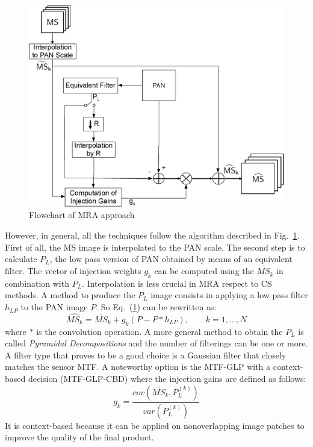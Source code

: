 \documentclass[12pt]{report}
\begin{document}
\begin{figure}[t!]
\centering
\includegraphics[width=\textwidth]{mra.png}
\caption{Flowchart of MRA approach \cite{criticalComparison}}
\label{fig:mraapproach}
\end{figure}

However, in general, all the techniques follow the algorithm described in Fig.~\ref{fig:mraapproach}. 
First of all, the MS image is interpolated to the PAN scale.
The second step is to calculate $P_L$, the low pass version of PAN obtained by means of an equivalent filter.
The vector of injection weights $g_k$ can be computed using the $\widetilde{MS_k}$ in combination with $P_L$.
Interpolation is less crucial in MRA respect to CS methods.
A method to produce the $P_L$ image consists in applying a low pass filter $h_{LP}$ to the PAN image $P$.
So Eq.~(\ref{fig:mraapproach}) can be rewritten as:
%
\begin{equation}
    \widehat{MS_k} = \widetilde{MS_k} + g_k(P-P*h_{LP}), \qquad k=1,\dots,N
    \label{mra1}
\end{equation}
%
where $*$ is the convolution operation.
A more general method to obtain the $P_L$ is called \textit{Pyramidal Decompositions} and the number of 
filterings can be one or more. A filter type that proves to be a good choice is a Gaussian filter that closely 
matches the sensor MTF. A noteworthy option is the MTF-GLP with a context-based decision (MTF-GLP-CBD) \cite{mtfglp}
where the injection gains are defined as follows: 
%
\begin{equation}
    g_k = \frac{cov(\widetilde{MS_k}, P_L^{(k)})}{var(P_L^{(k)})}
    \label{mragk}
\end{equation}
 It is context-based because it can be applied on nonoverlapping image patches to improve the quality of the final product.
\end{document}
